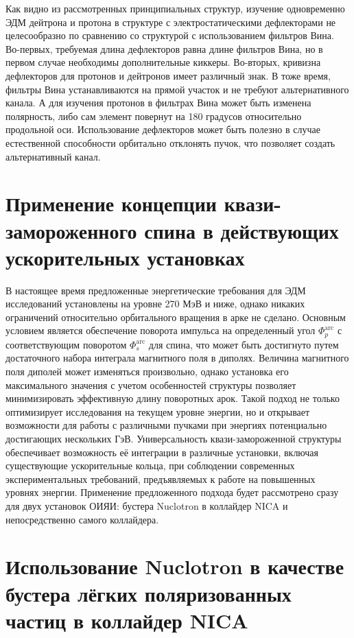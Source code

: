 \par  Как видно из рассмотренных принципиальных структур, изучение одновременно ЭДМ дейтрона и протона в структуре с электростатическими дефлекторами не целесообразно по сравнению со структурой с использованием фильтров Вина. Во-первых, требуемая длина дефлекторов равна длине фильтров Вина, но в первом случае необходимы дополнительные киккеры. Во-вторых, кривизна дефлекторов для протонов и дейтронов имеет различный знак. В тоже время, фильтры Вина устанавливаются на прямой участок и не требуют альтернативного канала. А для изучения протонов в фильтрах Вина может быть изменена полярность, либо сам элемент повернут на 180 градусов относительно продольной оси. Использование дефлекторов может быть полезно в случае естественной способности орбитально отклонять пучок, что позволяет создать альтернативный канал.

	\section{Применение концепции квази-замороженного спина в действующих ускорительных установках}\label{sec:EDM/nuclotron}

	\par В настоящее время предложенные энергетические требования для ЭДМ исследований установлены на уровне 270 МэВ и ниже, однако никаких ограничений относительно орбитального вращения в арке не сделано. Основным условием является обеспечение поворота импульса на определенный угол $\Phi_p^{\textrm{arc}}$ с соответствующим поворотом $\Phi_s^{\textrm{arc}}$ для спина, что может быть достигнуто путем достаточного набора интеграла магнитного поля в диполях. Величина магнитного поля диполей может изменяться произвольно, однако установка его максимального значения с учетом особенностей структуры позволяет минимизировать эффективную длину поворотных арок. Такой подход не только оптимизирует исследования на текущем уровне энергии, но и открывает возможности для работы с различными пучками при энергиях потенциально достигающих нескольких ГэВ. Универсальность квази-замороженной структуры обеспечивает возможность её интеграции в различные установки, включая существующие ускорительные кольца, при соблюдении современных экспериментальных требований, предъявляемых к работе на повышенных уровнях энергии. Применение предложенного подхода будет рассмотрено сразу для двух установок ОИЯИ: бустера Nuclotron в коллайдер NICA и непосредственно самого коллайдера.

	\section{Использование Nuclotron в качестве бустера лёгких поляризованных частиц в коллайдер NICA}\label{sec:EDM/nuclotron}

